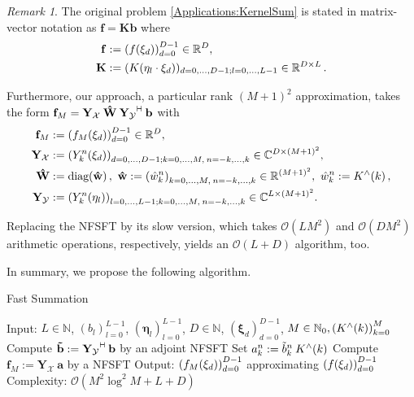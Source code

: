 \documentclass[11pt,a4paper,twoside,bibtotoc]{scrartcl}
\theoremstyle{plain}
\theoremstyle{definition}
\theoremstyle{remark}
\newtheorem{remark}[theorem]{Remark}
\newcommand{\adj}{{\vdash \hspace*{-1.72mm} \dashv}}
\newcommand{\N}{\ensuremath{\mathbb{N}}}
\newcommand{\NZ}{\ensuremath{\mathbb{N}_{0}}}
\newcommand{\R}{\ensuremath{\mathbb{R}}}
\newcommand{\C}{\ensuremath{\mathbb{C}}}
\newcommand{\fun}[2]{\ensuremath{#1{\hspace{-0.4ex}}\left(#2\right)}}
\newcommand{\paren}[1]{\ensuremath{\left(#1\right)}}
\newcommand{\mb}[1]{\mathbf{#1}}
\newcommand{\V}[1]{\mb{#1}}
\newcommand{\diag}{\text{\rm{diag}}}
\numberwithin{equation}{section}
\numberwithin{table}{section}
\numberwithin{figure}{section}
\begin{document}
\begin{remark}\label{rem:rankM}
The original problem \eqref{Applications:KernelSum} is stated in matrix-vector
notation as $\V{f}=\V{K} \V{b}$
where
\begin{align*}
  \V{f} & := \paren{\fun{f}{\V{\xi}_{d}}}_{d=0}^{D-1} \in \R^D,\\
  \V{K} & :=(\fun{K}{\V{\eta}_{l} \cdot
  \V{\xi}_d})_{d=0,\hdots,D-1;l=0,\hdots,L-1}\in \R^{D\times L}\,.
\end{align*}

Furthermore, our approach, a particular rank $(M+1)^2$ approximation, takes
the form
$
  \V{f}_M = \V{Y_{\mathcal{X}}} \: \V{\hat W} \:
  \V{Y_{\mathcal{Y}}}^{\adj} \: \V{b}
$
with
\begin{align}
  \nonumber
  \V{f}_M & := \paren{\fun{f_M}{\V{\xi}_{d}}}_{d=0}^{D-1} \in \R^D,
  \\ \nonumber
  \V{Y_{\mathcal{X}}} & := \paren{\fun{Y_k^n}{\V{\xi}_{d}}}_{d=0,\ldots,D-1;
  k=0,\ldots,M,\:n=-k,\ldots,k} \in \C^{D \times
  \paren{M+1}^2}, \\ \nonumber
  \V{\hat W} & := \fun{\diag}{\V{\hat w}},\ \V{\hat w} := \paren{\hat
  w_{k}^{n}}_{k=0,\ldots,M,\:n=-k,\ldots,k} \in \R^{(M+1)^2},\ \hat w_{k}^n :=
  \fun{K^{\wedge}}{k}, \\ \nonumber
  \V{Y_{\mathcal{Y}}} & := \paren{\fun{Y_k^n}{\V{\eta}_{l}}}_{l=0,\ldots,L-1;
  k=0,\ldots,M,\:n=-k,\ldots,k} \in \C^{L \times \paren{M+1}^2}.
\end{align}

Replacing the NFSFT by its slow version, which takes $\mathcal{O}(L M^2)$ and
$\mathcal{O}(D M^2)$ arithmetic operations, respectively, yields an
$\mathcal{O}(L+D)$ algorithm, too.
\end{remark}

In summary, we propose the following algorithm.
\begin{algorithm}[h]
  \caption{Fast Summation}
  \label{Applications:Algorithm:FastSummation}    
  \begin{algorithmic}
    \STATE  Input:  $L \in \N$, $\paren{b_{l}}_{l=0}^{L-1}$,
                    $\paren{\V{\eta}_{l}}_{l=0}^{L-1}$,  
                    $D \in \N$, $\paren{\V{\xi}_{d}}_{d=0}^{D-1}$, $M \in \NZ,
                    \paren{\fun{K^{\wedge}}{k}}_{k=0}^M$ 
    \STATE
    \STATE Compute $\V{\tilde{b}} := \V{Y_{\mathcal{Y}}}^{\adj} \: \V{b}$ by an
                    adjoint NFSFT 
        \STATE Set $a_{k}^n := \tilde{b}_{k}^n \: \fun{K^{\wedge}}{k}$
      \ENDFOR
    \ENDFOR
    \STATE Compute $\V{f}_M := \V{Y_{\mathcal{X}}} \: \V{a}$ by a NFSFT
    \STATE
    \STATE Output: $\paren{\fun{f_M}{\V{\xi}_{d}}}_{d=0}^{D-1}$ approximating
                    $\paren{\fun{f}{\V{\xi}_{d}}}_{d=0}^{D-1}$ 
    \STATE
    \STATE Complexity: $\mathcal{O}\left(M^2 \log^2M + L + D\right)$  
\end{algorithmic}
\end{algorithm}
\end{document}
